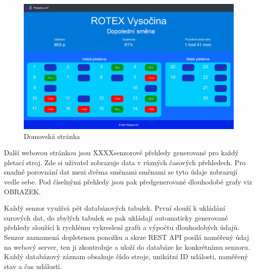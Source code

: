 \documentclass{template/socthesis}
\begin{document}
\begin{figure}[htbp]
    \centering
    \includegraphics[width=\textwidth]{img/Uvod.png}
    \caption{Domovská stránka}
    \label{fig:webUvod}
\end{figure}


Další webovou stránkou jsou XXXXsenzorové přehledy generované pro každý pletací stroj.
Zde si uživatel zobrazuje data v různých časových přehledech.
Pro snadně porovnání dat mezi dvěma směnami směnami se tyto údaje zobrazují vedle sebe.
Pod číselnými přehledy jsou pak předgenerované dlouhodobé grafy viz OBRAZEK.

Každý senzor využívá pět databázových tabulek. První slouží k ukládání surových dat, do zbylých tabulek se pak ukládají automaticky generované přehledy sloužící k rychlému vykreslení grafů a výpočtu dlouhodobých údajů.
Senzor zaznamená dopletenou ponožku a skrze REST API posílá naměřený údaj na webový server, ten ji zkontroluje a uloží do databáze ke konkrétnímu senzoru.
Každý databázový záznam obsahuje číslo stroje, unikátní ID události, naměřený stav a čas události.
\end{document}
